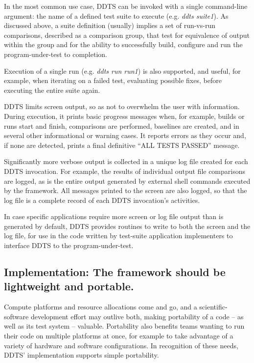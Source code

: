 \documentclass[conference]{IEEEtran}
\begin{document}
In the most common use case, DDTS can be invoked with a single command-line argument: the name of a defined test suite to execute (e.g. \emph{ddts suite1}). As discussed above, a suite definition (usually) implies a set of run-vs-run comparisons, described as a comparison group, that test for equivalence of output within the group and for the ability to successfully build, configure and run the program-under-test to completion.

Execution of a single run (e.g. \emph{ddts run run1}) is also supported, and useful, for example, when iterating on a failed test, evaluating possible fixes, before executing the entire suite again.

DDTS limits screen output, so as not to overwhelm the user with information. During execution, it prints basic progress messages when, for example, builds or runs start and finish, comparisons are performed, baselines are created, and in several other informational or warning cases. It reports errors as they occur and, if none are detected, prints a final definitive ``ALL TESTS PASSED'' message.

Significantly more verbose output is collected in a unique log file created for each DDTS invocation. For example, the results of individual output file comparisons are logged, as is the entire output generated by external shell commands executed by the framework. All messages printed to the screen are also logged, so that the log file is a complete record of each DDTS invocation's activities.

In case specific applications require more screen or log file output than is generated by default, DDTS provides routines to write to both the screen and the log file, for use in the code written by test-suite application implementers to interface DDTS to the program-under-test.

\subsection{Implementation: The framework should be lightweight and portable.}

Compute platforms and resource allocations come and go, and a scientific-software development effort may outlive both, making portability of a code -- as well as its test system -- valuable. Portability also benefits teams wanting to run their code on multiple platforms at once, for example to take advantage of a variety of hardware and software configurations. In recognition of these needs, DDTS' implementation supports simple portability.
\end{document}
